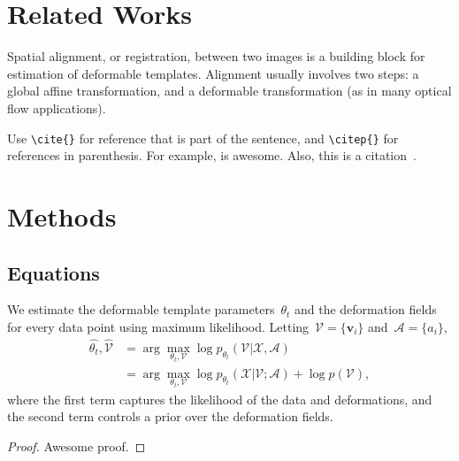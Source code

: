 \documentclass[twoside,11pt]{article}
\begin{document}
\section{Related Works}

Spatial alignment, or registration, between two images is a building block for estimation of deformable templates. Alignment usually involves two steps: a global affine transformation, and a deformable transformation (as in many optical flow applications).

Use \verb|\cite{}| for reference that is part of the sentence, and \verb|\citep{}| for references in parenthesis. For example, \cite{viola1997alignment} is awesome. Also, this is a citation~\citep{viola1997alignment}.



\section{Methods}

\subsection{Equations}

We estimate the deformable template parameters~$\theta_t$ and the deformation fields for every data point using maximum likelihood. Letting~$\mathcal{V} = \{\boldsymbol{v}_i\}$ and~$\mathcal{A} = \{a_i\}$,
%
\begin{align}
\hat{\theta_t}, \hat{\mathcal{V}} &= \arg \max_{\theta_t, \mathcal{V}} \log p_{\theta_t}(\mathcal{V} | \mathcal{X},  \mathcal{A}) \nonumber \\
&= \arg \max_{\theta_t, \mathcal{V}} \log p_{\theta_t}(\mathcal{X} | \mathcal{V}; \mathcal{A}) + \log p(\mathcal{V}),
\label{eq:logpost}
\end{align}
%
where the first term captures the likelihood of the data and deformations, and the second term controls a prior over the deformation fields.

\begin{proof}
    Awesome proof.
\end{proof}



\end{document}

